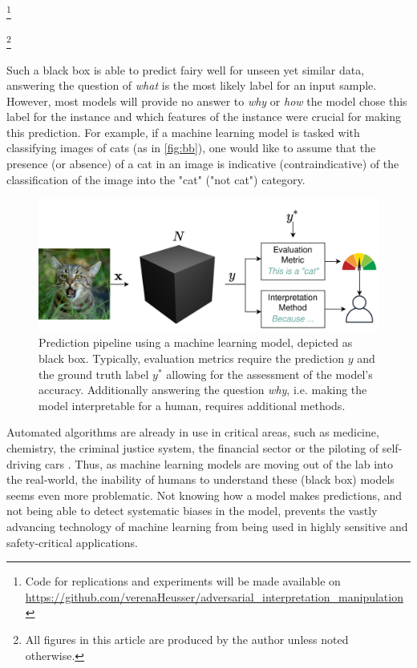 \documentclass[sigconf]{acmart}
\newcommand\blfootnote[1]{%
  \begingroup
  \renewcommand\thefootnote{}\footnote{#1}%
  \addtocounter{footnote}{-1}%
  \endgroup
}
\begin{document}
\blfootnote{Code for replications and experiments will be made available on \url{https://github.com/verenaHeusser/adversarial_interpretation_manipulation}}
\blfootnote{All figures in this article are produced by the author unless noted otherwise.}

Such a black box is able to predict fairy well for unseen yet similar data, answering the question of \textit{what} is the most likely label for an input sample. However, most models will provide no answer to \textit{why} or \textit{how} the model chose this label for the instance and which features of the instance were crucial for making this prediction. For example, if a machine learning model is tasked with classifying images of cats (as in \autoref{fig:bb}), one would like to assume that the presence (or absence) of a cat in an image is indicative (contraindicative) of the classification of the image into the "cat" ("not cat") category.

\begin{figure}[t]
    \centering
    \includegraphics[width=\linewidth]{figures/bb_cat.png}
    \caption{Prediction pipeline using a machine learning model, depicted as black box. Typically, evaluation metrics require the prediction $y$ and the ground truth label $y^*$ allowing for the assessment of the model's accuracy. Additionally answering the question \textit{why}, i.e. making the model interpretable for a human, requires additional methods.}
    \label{fig:bb}
    \vspace{-0.3cm}
\end{figure}

Automated algorithms are already in use in critical areas, such as medicine, chemistry, the criminal justice system, the financial sector or the piloting of self-driving cars \cite{chouldechova2017fair, elshawi2019interpretability, whitmore2016mapping}. %
Thus, as machine learning models are moving out of the lab into the real-world, the inability of humans to understand these (black box) models seems even more problematic. Not knowing how a model makes predictions, and not being able to detect systematic biases in the model, prevents the vastly advancing technology of machine learning from being used in highly sensitive and safety-critical applications.  
\end{document}
